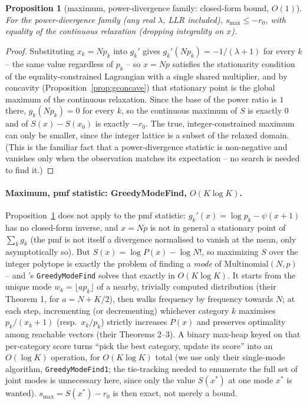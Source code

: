 \documentclass[11pt]{article}
\newtheorem{proposition}{Proposition}
\begin{document}
\begin{proposition}[maximum, power-divergence family: closed-form bound, $O(1)$]
\label{prop:intervalmax}
For the power-divergence family (any real $\lambda$, LLR included), $s_{\max}\le-r_0$, with
equality of the \emph{continuous} relaxation (dropping integrality on $x$).
\end{proposition}
\begin{proof}
Substituting $x_k=Np_k$ into $g_k'$ gives $g_k'(Np_k)=-1/(\lambda+1)$ for every $k$ -- the same value
regardless of $p_k$ -- so $x=Np$ satisfies the stationarity condition of the equality-constrained
Lagrangian with a single shared multiplier, and by concavity (Proposition~\ref{prop:gconcave}) that
stationary point is the global maximum of the continuous relaxation. Since the base of the power
ratio is $1$ there, $g_k(Np_k)=0$ for every $k$, so the continuous maximum of $S$ is exactly $0$ and
of $S(x)-S(x_0)$ is exactly $-r_0$. The true, integer-constrained maximum can only be smaller, since
the integer lattice is a subset of the relaxed domain. (This is the familiar fact that a
power-divergence statistic is non-negative and vanishes only when the observation matches its
expectation -- no search is needed to find it.)
\end{proof}

\paragraph{Maximum, pmf statistic: GreedyModeFind, $O(K\log K)$.} Proposition~\ref{prop:intervalmax}
does not apply to the pmf statistic: $g_k'(x)=\log p_k-\psi(x{+}1)$ has no closed-form inverse, and
$x=Np$ is not in general a stationary point of $\sum_kg_k$ (the pmf is not itself a divergence
normalised to vanish at the mean, only asymptotically so). But $S(x)=\log P(x)-\log N!$, so
maximizing $S$ over the integer polytope is exactly the problem of finding a \emph{mode} of
$\mathrm{Multinomial}(N,p)$ -- and \citet{whitehendy2010}'s \texttt{GreedyModeFind} solves that
exactly in $O(K\log K)$. It starts from the unique mode $w_k=\lfloor ap_k\rfloor$ of a nearby,
trivially computed distribution (their Theorem 1, for $a=N+K/2$), then walks frequency by frequency
towards $N$; at each step, incrementing (or decrementing) whichever category $k$ maximises
$p_k/(x_k{+}1)$ (resp.\ $x_k/p_k$) strictly increases $P(x)$ and preserves optimality among reachable
vectors (their Theorems 2--3). A binary max-heap keyed on that per-category score turns ``pick the
best category, update its score'' into an $O(\log K)$ operation, for $O(K\log K)$ total (we use only
their single-mode algorithm, \texttt{GreedyModeFind1}; the tie-tracking needed to enumerate the full
set of joint modes is unnecessary here, since only the value $S(x^\ast)$ at one mode $x^\ast$ is
wanted). $s_{\max}=S(x^\ast)-r_0$ is then exact, not merely a bound.
\end{document}
